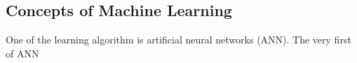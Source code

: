 \subsection{Concepts of Machine Learning}
One of the learning algorithm is artificial neural networks (ANN). The very first of ANN